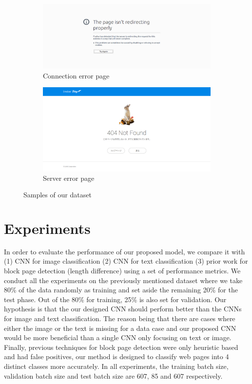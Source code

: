 \documentclass{article} %
\begin{document}
\begin{figure}
\begin{subfigure}[b]{0.2\textwidth}
        \centering
        \includegraphics[width=\textwidth]{connectionerr.png}
        \caption{Connection error page}
        \label{fig:connectionerror}
    \end{subfigure}
    \hfill
    \begin{subfigure}[b]{0.2\textwidth}
        \centering
        \includegraphics[width=\textwidth]{servererr.png}
        \caption{Server error page}
        \label{fig:servererror}
    \end{subfigure}
    \caption{Samples of our dataset}
    \label{fig:sample_dataset}
\end{figure}
\section{Experiments}
\label{experiments}
In order to evaluate the performance of our proposed model, we compare it with (1) CNN for image classification (2) CNN for text classification (3) prior work for block page detection (length difference) using a set of performance metrics. We conduct all the experiments on the previously mentioned dataset where we take 80\% of the data randomly as training and set aside the remaining 20\% for the test phase. Out of the 80\% for training, 25\% is also set for validation. Our hypothesis is that the our designed CNN should perform better than the CNNs for image and text classification. The reason being that there are cases where either the image or the text is missing for a data case and our proposed CNN would be more beneficial than a single CNN only focusing on text or image. Finally, previous techniques for block page detection were only heuristic based and had false positives, our method is designed to classify web pages into 4 distinct classes more accurately. In all experiments, the training batch size, validation batch size and test batch size are 607, 85 and 607 respectively.
\end{document}

